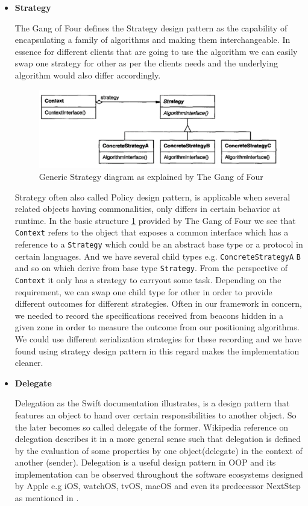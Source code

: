 \begin{itemize}
	\item \textbf{Strategy}
	\par The Gang of Four \cite{gamma1995design} defines the Strategy design pattern as the capability of encapsulating  a family of algorithms and making them interchangeable. In essence for different clients that are going to use the algorithm we can easily swap one strategy for other as per the clients needs and the underlying algorithm would also differ accordingly.
	\begin{figure}[H]
		\centering
		\includegraphics[scale = 0.5]{images/strategy}
		\caption{Generic Strategy diagram as explained by The Gang of Four  \cite{gamma1995design}}
		\label{figure:design_pattern_strategy}
	\end{figure}
	\par Strategy often also called Policy design pattern, is applicable when several related objects having commonalities, only differs in certain behavior at runtime. In the basic structure \ref{figure:design_pattern_strategy} provided by The Gang of Four \cite{gamma1995design} we see that \texttt{Context} refers to the object that exposes a common interface which has a reference to a \texttt{Strategy} which could be an abstract base type or a protocol in certain languages. And we have several child types e.g. \texttt{ConcreteStrategyA} \texttt{B} and so on which derive from base type \texttt{Strategy}. From the perspective of \texttt{Context} it only has a strategy to carryout some task. Depending on the requirement, we can swap one child type for other in order to provide different outcomes for different strategies. Often in our framework in concern, we needed to record the specifications received from beacons hidden in a given zone in order to measure the outcome from our positioning algorithms. We could use different serialization strategies for these recording and we have found using strategy design pattern in this regard makes the implementation cleaner.
	\item \textbf{Delegate}
	\par Delegation as the Swift documentation \cite{swiftdelegation} illustrates, is a design pattern that features an object to hand over certain responsibilities to another object. So the later becomes so called delegate of the former. Wikipedia reference \cite{wikidelegation} on delegation describes it in a more general sense such that delegation is defined by the evaluation of some properties by one object(delegate) in the context of another (sender). Delegation is a useful design pattern in OOP and its implementation can be observed throughout the software ecosystems designed by Apple e.g iOS, watchOS, tvOS, macOS and even its predecessor NextStep as mentioned in \cite{wikidelegation}.

\end{itemize}
